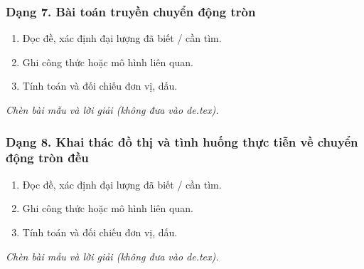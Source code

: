\subsubsection{Dạng 7. Bài toán truyền chuyển động tròn}
\begin{phuongphap}
\begin{enumerate}
\item Đọc đề, xác định đại lượng đã biết / cần tìm.
\item Ghi công thức hoặc mô hình liên quan.
\item Tính toán và đối chiếu đơn vị, dấu.
\end{enumerate}
\end{phuongphap}
\begin{vidumau}
\textit{Chèn bài mẫu và lời giải (không đưa vào de.tex).}
\end{vidumau}

\subsubsection{Dạng 8. Khai thác đồ thị và tình huống thực tiễn về chuyển động tròn đều}
\begin{phuongphap}
\begin{enumerate}
\item Đọc đề, xác định đại lượng đã biết / cần tìm.
\item Ghi công thức hoặc mô hình liên quan.
\item Tính toán và đối chiếu đơn vị, dấu.
\end{enumerate}
\end{phuongphap}
\begin{vidumau}
\textit{Chèn bài mẫu và lời giải (không đưa vào de.tex).}
\end{vidumau}

